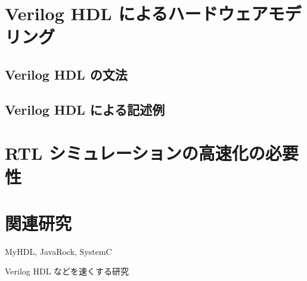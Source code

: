 \section{Verilog HDL によるハードウェアモデリング}


\subsection{Verilog HDL の文法}




\subsection{Verilog HDL による記述例}

\section{RTL シミュレーションの高速化の必要性}

\section{関連研究}

MyHDL, JavaRock, SystemC

Verilog HDL などを速くする研究
